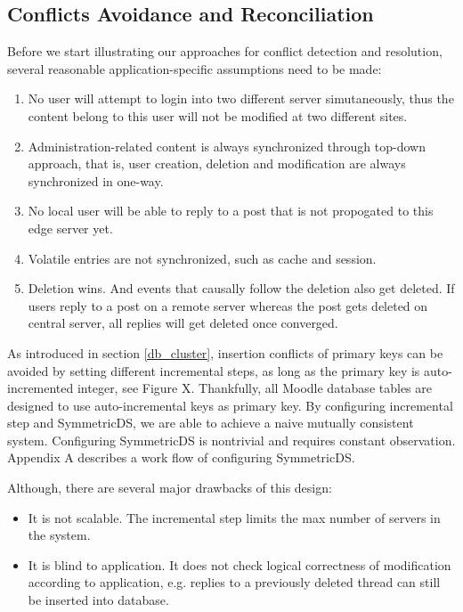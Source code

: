 \subsection{Conflicts Avoidance and Reconciliation} \label{multi_master}
Before we start illustrating our approaches for conflict detection and resolution, several reasonable application-specific assumptions need to be made:
\begin{enumerate}[label=\bfseries Assumption \arabic*:]
\item No user will attempt to login into two different server simutaneously, thus the content belong to this user will not be modified at two different sites.
\item Administration-related content is always synchronized through top-down approach, that is, user creation, deletion and modification are always synchronized in one-way.
\item No local user will be able to reply to a post that is not propogated to this edge server yet.
\item Volatile entries are not synchronized, such as cache and session.
\item Deletion wins. And events that causally follow the deletion also get deleted. If users reply to a post on a remote server whereas the post gets deleted on central server, all replies will get deleted once converged.
\end{enumerate}

As introduced in section \ref{db_cluster}, insertion conflicts of primary keys can be avoided by setting different incremental steps, as long as the primary key is auto-incremented integer, see Figure X.
Thankfully, all Moodle database tables are designed to use auto-incremental keys as primary key. By configuring incremental step and SymmetricDS, we are able to achieve a naive mutually consistent system. Configuring SymmetricDS is nontrivial and requires constant observation. Appendix A describes a work flow of configuring SymmetricDS.

Although, there are several major drawbacks of this design:
\begin{itemize}
\item It is not scalable. The incremental step limits the max number of servers in the system.
\item It is blind to application. It does not check logical correctness of modification according to application, e.g. replies to a previously deleted thread can still be inserted into database.
\end{itemize}

